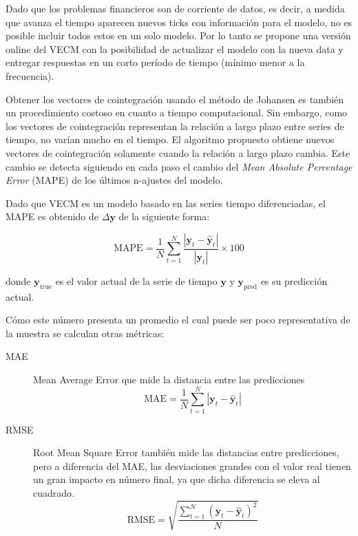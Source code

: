 Dado que los problemas financieros son de corriente de datos, es decir, a
medida que avanza el tiempo aparecen nuevos ticks con información para el
modelo, no es posible incluir todos estos en un solo modelo.  Por lo tanto se
propone una versión online del VECM con la posibilidad de actualizar el modelo
con la nueva data y entregar respuestas en un corto período de tiempo (mínimo
menor a la frecuencia).

Obtener los vectores de cointegración usando el método de Johansen es también
un procedimiento costoso en cuanto a tiempo computacional. Sin embargo, como
los vectores de cointegración representan la relación a largo plazo entre
series de tiempo, no varían mucho en el tiempo. El algoritmo propuesto obtiene
nuevos vectores de cointegración solamente cuando la relación a largo plazo
cambia. Este cambio se detecta siguiendo en cada paso el cambio del \emph{Mean
Absolute Percentage Error} (MAPE) de los últimos n-ajustes del modelo.

Dado que VECM es un modelo basado en las series tiempo diferenciadas, el MAPE
es obtenido de $\Delta \mathbf{y}$ de la siguiente forma:

\begin{equation}\label{eq:MAPE}
\text{MAPE} = \frac{1}{N} \sum_{t=1}^{N} 
\frac{\left|\mathbf{y}_t-\hat{\mathbf{y}}_t\right|}{\left|\mathbf{y}_t\right|}
 \times 100 
\end{equation}


\noindent donde $\mathbf{y}_{\text{true}}$ es el valor actual de la
serie de tiempo $\mathbf{y}$ y $\mathbf{y}_{\text{pred}}$
es su predicción actual.

Cómo este número presenta un promedio el cual puede ser poco representativa de
la muestra se calculan otras métricas:

\begin{description}
\item[MAE] Mean Average Error que mide la distancia entre las predicciones
\begin{equation}\label{eq:MAE}
\text{MAE} = \frac{1}{N} \sum_{t=1}^{N} 
\left| 
\mathbf{y}_t-\hat{\mathbf{y}}_t
\right| 
\end{equation}
\item[RMSE] Root Mean Square Error también mide las distancias entre
predicciones, pero a diferencia del MAE, las desviaciones grandes con el valor
real tienen un gran impacto en número final, ya que dicha diferencia se eleva
al cuadrado.
\begin{equation}\label{eq:RMSE}
\text{RMSE} = \sqrt{
\frac{\displaystyle \sum_{t=1}^{N} (\mathbf{y}_t-\hat{\mathbf{y}}_t)^2}{N}}
\end{equation}
\end{description}

